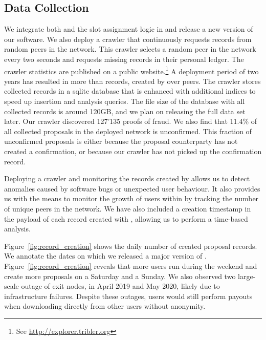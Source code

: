 \subsection{Data Collection}
We integrate both \ModelName{} and the slot assignment logic in \Tribler{} and release a new version of our software.
We also deploy a crawler that continuously requests \ModelName{} records from random peers in the \Tribler{} network.
This crawler selects a random peer in the \ModelName{} network every two seconds and requests missing records in their personal ledger.
The crawler statistics are published on a public website.\footnote{See \url{http://explorer.tribler.org}}
A deployment period of two years has resulted in more than \TrialRecords{} records, created by over \TrialUsers{} peers.
The crawler stores collected records in a sqlite database that is enhanced with additional indices to speed up insertion and analysis queries.
The file size of the database with all collected records is around 120GB, and we plan on releasing the full data set later.
Our crawler discovered 127'135 proofs of fraud.
We also find that 11.4\% of all collected proposals in the deployed \ModelName{} network is unconfirmed.
This fraction of unconfirmed proposals is either because the proposal counterparty has not created a confirmation, or because our crawler has not picked up the confirmation record.

Deploying a crawler and monitoring the records created by \ModelName{} allows us to detect anomalies caused by software bugs or unexpected user behaviour.
It also provides us with the means to monitor the growth of users within \Tribler{} by tracking the number of unique peers in the \ModelName{} network.
We have also included a creation timestamp in the payload of each record created with \Tribler{}, allowing us to perform a time-based analysis.

Figure~\ref{fig:record_creation} shows the daily number of created proposal records.
We annotate the dates on which we released a major version of \Tribler{}.
Figure~\ref{fig:record_creation} reveals that more users run \Tribler{} during the weekend and create more proposals on a Saturday and a Sunday.
We also observed two large-scale outage of exit nodes, in April 2019 and May 2020, likely due to infrastructure failures.
Despite these outages, users would still perform payouts when downloading directly from other \Tribler{} users without anonymity.


